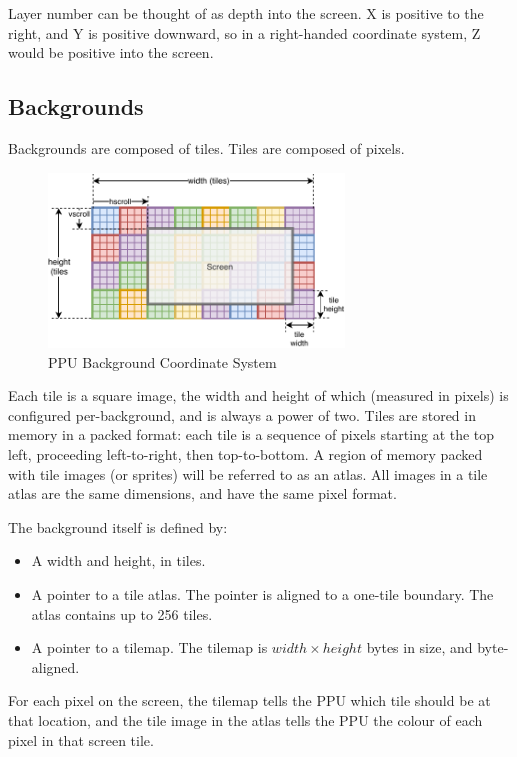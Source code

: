 \documentclass[notitlepage]{article}
\begin{document}
Layer number can be thought of as depth into the screen. X is positive to the right, and Y is positive downward, so in a right-handed coordinate system, Z would be positive into the screen.

\subsection{Backgrounds}

Backgrounds are composed of tiles. Tiles are composed of pixels.

\begin{figure}[H]
\centering
\caption{PPU Background Coordinate System}
\label{diagram:ppu_bg_coords}
\includegraphics[width=0.7\textwidth]{diagrams/ppu_bg_coords.pdf}
\end{figure}

Each tile is a square image, the width and height of which (measured in pixels) is configured per-background, and is always a power of two. Tiles are stored in memory in a packed format: each tile is a sequence of pixels starting at the top left, proceeding left-to-right, then top-to-bottom. A region of memory packed with tile images (or sprites) will be referred to as an atlas. All images in a tile atlas are the same dimensions, and have the same pixel format.

The background itself is defined by:

\begin{itemize}
	\item A width and height, in tiles.
	\item A pointer to a tile atlas. The pointer is aligned to a one-tile boundary. The atlas contains up to 256 tiles.
	\item A pointer to a tilemap. The tilemap is $width \times height$ bytes in size, and byte-aligned.
\end{itemize}

For each pixel on the screen, the tilemap tells the PPU which tile should be at that location, and the tile image in the atlas tells the PPU the colour of each pixel in that screen tile.
\end{document}
